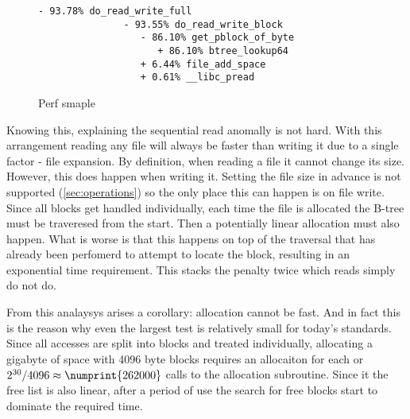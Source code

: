         \begin{figure}[h]
            \caption{Perf smaple}
            \label{fig:perf_sample}
            \begin{lstlisting}[gobble=12]
            - 93.78% do_read_write_full
               - 93.55% do_read_write_block
                  - 86.10% get_pblock_of_byte
                     + 86.10% btree_lookup64
                  + 6.44% file_add_space
                  + 0.61% __libc_pread
            \end{lstlisting}
        \end{figure}

        Knowing this, explaining the sequential read anomally is not hard. With
        this arrangement reading any file will always be faster than writing it
        due to a single factor - file expansion. By definition, when reading a
        file it cannot change its size. However, this does happen when writing
        it. Setting the file size in advance is not supported
        (\autoref{sec:operations}) so the only place this can happen is on file
        write. Since all blocks get handled individually, each time the file is
        allocated the B-tree must be traveresed from the start. Then a
        potentially linear allocation must also happen. What is worse is that
        this happens on top of the traversal that has already been perfomerd to
        attempt to locate the block, resulting in an exponential time
        requirement. This stacks the penalty twice which reads simply do not
        do.

        From this analaysys arises a corollary: allocation cannot be fast. And
        in fact this is the reason why even the largest test is relatively
        small for today's standards. Since all accesses are split into blocks
        and treated individually, allocating a gigabyte of space with 4096 byte
        blocks requires an allocaiton for each or $2^{30} / 4096 \approx
        \numprint{262000}$ calls to the allocation subroutine. Since it the
        free list is also linear, after a period of use the search for free
        blocks start to dominate the required time.



